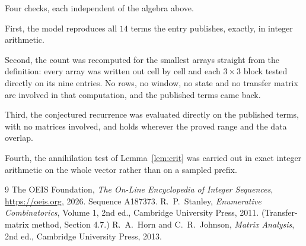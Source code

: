 \documentclass[11pt,a4paper]{article}
\theoremstyle{plain}
\theoremstyle{definition}
\begin{document}
Four checks, each independent of the algebra above.

First, the model reproduces all $14$ terms the entry publishes, exactly, in integer
arithmetic.

Second, the count was recomputed for the smallest arrays straight from the definition: every
array was written out cell by cell and each $3\times3$ block tested directly on its nine
entries. No rows, no window, no state and no transfer matrix are involved in that computation,
and the published terms came back.

Third, the conjectured recurrence was evaluated directly on the published terms, with no
matrices involved, and holds wherever the proved range and the data overlap.

Fourth, the annihilation test of Lemma~\ref{lem:crit} was carried out in exact integer
arithmetic on the whole vector rather than on a sampled prefix.

\begin{thebibliography}{9}
 The OEIS Foundation, \emph{The On-Line Encyclopedia of Integer
Sequences}, \url{https://oeis.org}, 2026. Sequence A187373.
 R.~P.~Stanley, \emph{Enumerative Combinatorics}, Volume 1, 2nd ed.,
Cambridge University Press, 2011. (Transfer-matrix method, Section 4.7.)
 R.~A.~Horn and C.~R.~Johnson, \emph{Matrix Analysis}, 2nd ed., Cambridge
University Press, 2013.
\end{thebibliography}
\end{document}
